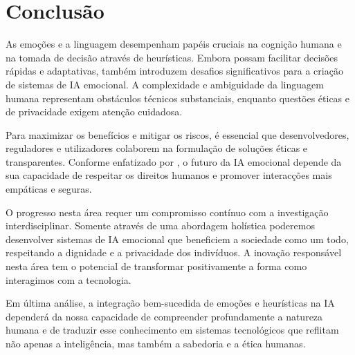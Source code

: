 \documentclass[a4paper,12pt]{report}
\begin{document}
	\section{Conclusão}
	
	As emoções e a linguagem desempenham papéis cruciais na cognição humana e na tomada de decisão através de heurísticas. Embora possam facilitar decisões rápidas e adaptativas, também introduzem desafios significativos para a criação de sistemas de IA emocional. A complexidade e ambiguidade da linguagem humana representam obstáculos técnicos substanciais, enquanto questões éticas e de privacidade exigem atenção cuidadosa.
	
	Para maximizar os benefícios e mitigar os riscos, é essencial que desenvolvedores, reguladores e utilizadores colaborem na formulação de soluções éticas e transparentes. Conforme enfatizado por \textcite{russell2020}, o futuro da IA emocional depende da sua capacidade de respeitar os direitos humanos e promover interacções mais empáticas e seguras.
	
	O progresso nesta área requer um compromisso contínuo com a investigação interdisciplinar. Somente através de uma abordagem holística poderemos desenvolver sistemas de IA emocional que beneficiem a sociedade como um todo, respeitando a dignidade e a privacidade dos indivíduos. A inovação responsável nesta área tem o potencial de transformar positivamente a forma como interagimos com a tecnologia.
	
	Em última análise, a integração bem-sucedida de emoções e heurísticas na IA dependerá da nossa capacidade de compreender profundamente a natureza humana e de traduzir esse conhecimento em sistemas tecnológicos que reflitam não apenas a inteligência, mas também a sabedoria e a ética humanas.
	
	\newpage
	
	\printbibliography
	
\end{document}
